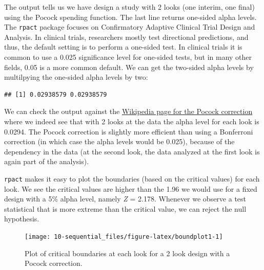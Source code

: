 \documentclass[
  oneside]{book}
\newenvironment{Shaded}{\begin{snugshade}}{\end{snugshade}}
\newcommand{\DecValTok}[1]{\textcolor[rgb]{0.00,0.00,0.81}{#1}}
\newcommand{\NormalTok}[1]{#1}
\newcommand{\SpecialCharTok}[1]{\textcolor[rgb]{0.00,0.00,0.00}{#1}}
\begin{document}
The output tells us we have design a study with 2 looks (one interim, one final) using the Pocock spending function. The last line returns one-sided alpha levels. The \texttt{rpact} package focuses on Confirmatory Adaptive Clinical Trial Design and Analysis. In clinical trials, researchers mostly test directional predictions, and thus, the default setting is to perform a one-sided test. In clinical trials it is common to use a 0.025 significance level for one-sided tests, but in many other fields, 0.05 is a more common default. We can get the two-sided alpha levels by multilpying the one-sided alpha levels by two:

\begin{Shaded}
\end{Shaded}

\begin{verbatim}
## [1] 0.02938579 0.02938579
\end{verbatim}

We can check the output against the \href{https://en.wikipedia.org/wiki/Pocock_boundary}{Wikipedia page for the Pocock correction} where we indeed see that with 2 looks at the data the alpha level for each look is 0.0294. The Pocock correction is slightly more efficient than using a Bonferroni correction (in which case the alpha levels would be 0.025), because of the dependency in the data (at the second look, the data analyzed at the first look is again part of the analysis).

\texttt{rpact} makes it easy to plot the boundaries (based on the critical values) for each look. We see the critical values are higher than the 1.96 we would use for a fixed design with a 5\% alpha level, namely \emph{Z} = 2.178. Whenever we observe a test statistical that is more extreme than the critical value, we can reject the null hypothesis.



\begin{figure}

{\centering \texttt{[image: 10-sequential\_files/figure-latex/boundplot1-1]} 

}

\caption{Plot of critical boundaries at each look for a 2 look design with a Pocock correction.}\label{fig:boundplot1}
\end{figure}
\end{document}
